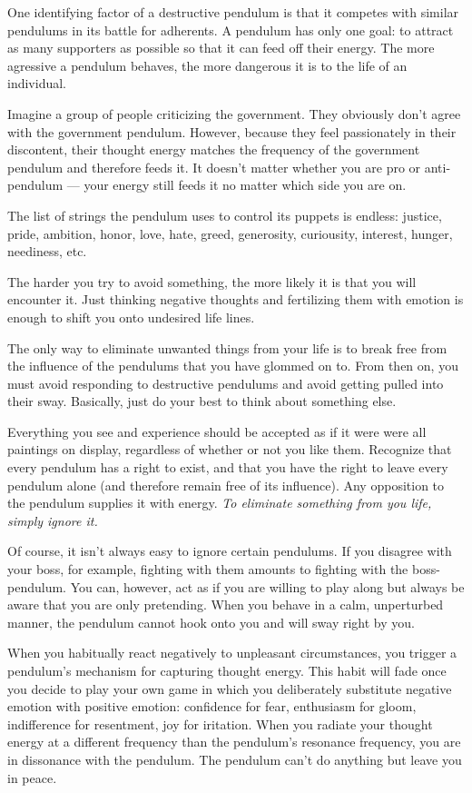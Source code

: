 \documentclass[
  openany]{book}
\begin{document}
One identifying factor of a destructive pendulum is that it competes with similar pendulums in its battle for adherents. A pendulum has only one goal: to attract as many supporters as possible so that it can feed off their energy. The more agressive a pendulum behaves, the more dangerous it is to the life of an individual.

Imagine a group of people criticizing the government. They obviously don't agree with the government pendulum. However, because they feel passionately in their discontent, their thought energy matches the frequency of the government pendulum and therefore feeds it. It doesn't matter whether you are pro or anti-pendulum --- your energy still feeds it no matter which side you are on.

The list of strings the pendulum uses to control its puppets is endless: justice, pride, ambition, honor, love, hate, greed, generosity, curiousity, interest, hunger, neediness, etc.

The harder you try to avoid something, the more likely it is that you will encounter it. Just thinking negative thoughts and fertilizing them with emotion is enough to shift you onto undesired life lines.

The only way to eliminate unwanted things from your life is to break free from the influence of the pendulums that you have glommed on to. From then on, you must avoid responding to destructive pendulums and avoid getting pulled into their sway. Basically, just do your best to think about something else.

Everything you see and experience should be accepted as if it were were all paintings on display, regardless of whether or not you like them. Recognize that every pendulum has a right to exist, and that you have the right to leave every pendulum alone (and therefore remain free of its influence). Any opposition to the pendulum supplies it with energy. \emph{To eliminate something from you life, simply ignore it.}

Of course, it isn't always easy to ignore certain pendulums. If you disagree with your boss, for example, fighting with them amounts to fighting with the boss-pendulum. You can, however, act as if you are willing to play along but always be aware that you are only pretending. When you behave in a calm, unperturbed manner, the pendulum cannot hook onto you and will sway right by you.

When you habitually react negatively to unpleasant circumstances, you trigger a pendulum's mechanism for capturing thought energy. This habit will fade once you decide to play your own game in which you deliberately substitute negative emotion with positive emotion: confidence for fear, enthusiasm for gloom, indifference for resentment, joy for iritation. When you radiate your thought energy at a different frequency than the pendulum's resonance frequency, you are in dissonance with the pendulum. The pendulum can't do anything but leave you in peace.
\end{document}
